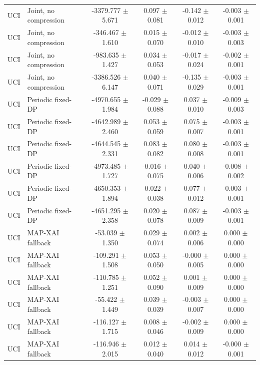 \begin{table}[t]
\begin{tabular}{llcccc}
UCI & Joint, no compression & -3379.777 $\pm$ 5.671 & 0.097 $\pm$ 0.081 & -0.142 $\pm$ 0.012 & -0.003 $\pm$ 0.001 \\
UCI & Joint, no compression & -346.467 $\pm$ 1.610 & 0.015 $\pm$ 0.070 & -0.012 $\pm$ 0.010 & -0.003 $\pm$ 0.003 \\
UCI & Joint, no compression & -983.635 $\pm$ 1.427 & 0.034 $\pm$ 0.053 & -0.017 $\pm$ 0.024 & -0.002 $\pm$ 0.001 \\
UCI & Joint, no compression & -3386.526 $\pm$ 6.147 & 0.040 $\pm$ 0.071 & -0.135 $\pm$ 0.029 & -0.003 $\pm$ 0.001 \\
UCI & Periodic fixed-DP & -4970.655 $\pm$ 1.984 & -0.029 $\pm$ 0.088 & 0.037 $\pm$ 0.010 & -0.009 $\pm$ 0.003 \\
UCI & Periodic fixed-DP & -4642.989 $\pm$ 2.460 & 0.053 $\pm$ 0.059 & 0.075 $\pm$ 0.007 & -0.003 $\pm$ 0.001 \\
UCI & Periodic fixed-DP & -4644.545 $\pm$ 2.331 & 0.083 $\pm$ 0.082 & 0.080 $\pm$ 0.008 & -0.003 $\pm$ 0.001 \\
UCI & Periodic fixed-DP & -4973.485 $\pm$ 1.727 & -0.016 $\pm$ 0.075 & 0.040 $\pm$ 0.006 & -0.008 $\pm$ 0.002 \\
UCI & Periodic fixed-DP & -4650.353 $\pm$ 1.894 & -0.022 $\pm$ 0.038 & 0.077 $\pm$ 0.012 & -0.003 $\pm$ 0.001 \\
UCI & Periodic fixed-DP & -4651.295 $\pm$ 2.358 & 0.020 $\pm$ 0.078 & 0.087 $\pm$ 0.009 & -0.003 $\pm$ 0.001 \\
UCI & MAP-XAI fallback & -53.039 $\pm$ 1.350 & 0.029 $\pm$ 0.074 & 0.002 $\pm$ 0.006 & 0.000 $\pm$ 0.000 \\
UCI & MAP-XAI fallback & -109.291 $\pm$ 1.508 & 0.053 $\pm$ 0.050 & -0.000 $\pm$ 0.005 & 0.000 $\pm$ 0.000 \\
UCI & MAP-XAI fallback & -110.785 $\pm$ 1.251 & 0.052 $\pm$ 0.090 & 0.001 $\pm$ 0.009 & 0.000 $\pm$ 0.000 \\
UCI & MAP-XAI fallback & -55.422 $\pm$ 1.449 & 0.039 $\pm$ 0.039 & -0.003 $\pm$ 0.007 & 0.000 $\pm$ 0.000 \\
UCI & MAP-XAI fallback & -116.127 $\pm$ 1.715 & 0.008 $\pm$ 0.046 & -0.002 $\pm$ 0.009 & 0.000 $\pm$ 0.000 \\
UCI & MAP-XAI fallback & -116.946 $\pm$ 2.015 & 0.012 $\pm$ 0.040 & 0.014 $\pm$ 0.012 & -0.000 $\pm$ 0.001 \\
\bottomrule
\end{tabular}
\end{table}

